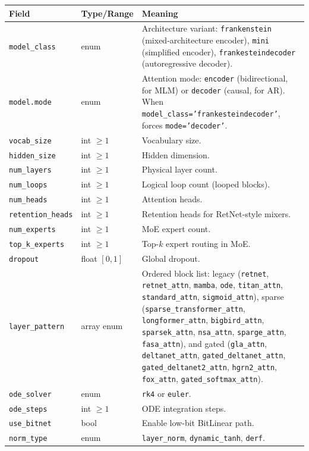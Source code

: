 \small
\begin{longtable}{p{5.1cm}p{2.4cm}p{7.0cm}}
\toprule
\textbf{Field} & \textbf{Type/Range} & \textbf{Meaning} \\
\midrule
\endhead
\texttt{model\_class} & enum & Architecture variant: \texttt{frankenstein} (mixed-architecture encoder), \texttt{mini} (simplified encoder), \texttt{frankesteindecoder} (autoregressive decoder). \\
\texttt{model.mode} & enum & Attention mode: \texttt{encoder} (bidirectional, for MLM) or \texttt{decoder} (causal, for AR). When \texttt{model\_class='frankesteindecoder'}, forces \texttt{mode='decoder'}. \\
\texttt{vocab\_size} & int $\ge 1$ & Vocabulary size. \\
\texttt{hidden\_size} & int $\ge 1$ & Hidden dimension. \\
\texttt{num\_layers} & int $\ge 1$ & Physical layer count. \\
\texttt{num\_loops} & int $\ge 1$ & Logical loop count (looped blocks). \\
\texttt{num\_heads} & int $\ge 1$ & Attention heads. \\
\texttt{retention\_heads} & int $\ge 1$ & Retention heads for RetNet-style mixers. \\
\texttt{num\_experts} & int $\ge 1$ & MoE expert count. \\
\texttt{top\_k\_experts} & int $\ge 1$ & Top-$k$ expert routing in MoE. \\
\texttt{dropout} & float $[0,1]$ & Global dropout. \\
\texttt{layer\_pattern} & array enum & Ordered block list: legacy (\texttt{retnet}, \texttt{retnet\_attn}, \texttt{mamba}, \texttt{ode}, \texttt{titan\_attn}, \texttt{standard\_attn}, \texttt{sigmoid\_attn}), sparse (\texttt{sparse\_transformer\_attn}, \texttt{longformer\_attn}, \texttt{bigbird\_attn}, \texttt{sparsek\_attn}, \texttt{nsa\_attn}, \texttt{sparge\_attn}, \texttt{fasa\_attn}), and gated (\texttt{gla\_attn}, \texttt{deltanet\_attn}, \texttt{gated\_deltanet\_attn}, \texttt{gated\_deltanet2\_attn}, \texttt{hgrn2\_attn}, \texttt{fox\_attn}, \texttt{gated\_softmax\_attn}). \\
\texttt{ode\_solver} & enum & \texttt{rk4} or \texttt{euler}. \\
\texttt{ode\_steps} & int $\ge 1$ & ODE integration steps. \\
\texttt{use\_bitnet} & bool & Enable low-bit BitLinear path. \\
\texttt{norm\_type} & enum & \texttt{layer\_norm}, \texttt{dynamic\_tanh}, \texttt{derf}. \\

\end{longtable}
